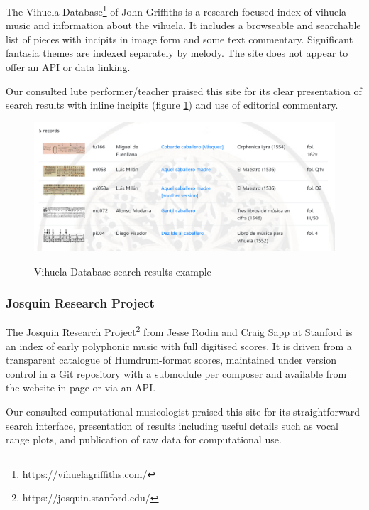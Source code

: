 \documentclass[sigconf, nonacm=true]{acmart}
\begin{document}
\begin{sloppypar}
  The Vihuela Database\footnote{https://vihuelagriffiths.com/} of John
  Griffiths is a research-focused index of vihuela music and
  information about the vihuela. It includes a browseable and
  searchable list of pieces with incipits in image form and some text
  commentary. Significant fantasia themes are indexed separately by
  melody. The site does not appear to offer an API or data linking.

  Our consulted lute performer/teacher praised this site for its clear
  presentation of search results with inline incipits (figure
  \ref{fig:vihuela}) and use of editorial commentary.
  
  \begin{figure}[h]
  \centering
  \caption{Vihuela Database search results example}
  \includegraphics[width=\columnwidth]{images/vihuela-search-results}
  \label{fig:vihuela}
  \end{figure}
  
  \subsubsection{Josquin Research Project}

  The Josquin Research Project\footnote{https://josquin.stanford.edu/}
  from Jesse Rodin and Craig Sapp at Stanford is an index of early
  polyphonic music with full digitised scores. It is driven from a
  transparent catalogue of Humdrum-format scores, maintained under
  version control in a Git repository with a submodule per composer
  and available from the website in-page or via an API.

  Our consulted computational musicologist praised this site for its
  straightforward search interface, presentation of results including
  useful details such as vocal range plots, and publication of raw
  data for computational use.
  

\end{sloppypar}
\end{document}
